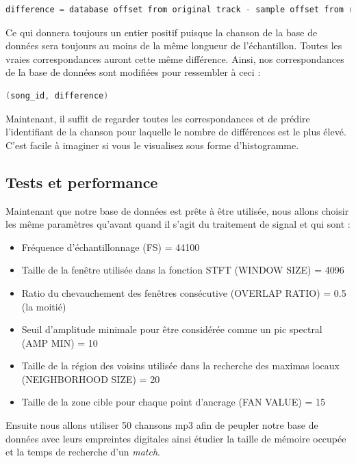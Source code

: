 \documentclass[11pt, report, french]{scrreprt}
\begin{document}
\begin{lstlisting}[language=C]
difference = database offset from original track - sample offset from recording
\end{lstlisting}

\vspace{0.5cm}
Ce qui donnera toujours un entier positif puisque la chanson de la base de données sera toujours au moins de la même longueur de l'échantillon. Toutes les vraies correspondances auront cette même différence. Ainsi, nos correspondances de la base de données sont modifiées pour ressembler à ceci : \\

\begin{lstlisting}[language=C]
(song_id, difference)
\end{lstlisting}

\vspace{0.5cm}
Maintenant, il suffit de regarder toutes les correspondances et de prédire l'identifiant de la chanson pour laquelle le nombre de différences est le plus élevé. C'est facile à imaginer si vous le visualisez sous forme d'histogramme.\\

\subsection{Tests et performance}
Maintenant que notre base de données est prête à être utilisée, nous allons choisir les même paramètres qu'avant quand il s'agit du traitement de signal et qui sont : \\

 \begin{itemize}
 	\item Fréquence d'échantillonnage (FS) = 44100
 	\item Taille de la fenêtre utilisée dans la fonction STFT (WINDOW SIZE) = 4096
 	\item Ratio du chevauchement des fenêtres consécutive (OVERLAP RATIO) = 0.5 (la moitié)
 	\item Seuil d'amplitude minimale pour être considérée comme un pic spectral (AMP MIN) = 10
 	\item Taille de la région des voisins utilisée dans la recherche des maximas locaux (NEIGHBORHOOD SIZE) = 20
 	\item Taille de la zone cible pour chaque point d'ancrage (FAN VALUE) = 15
 \end{itemize}

\vspace{0.5cm}
Ensuite nous allons utiliser 50 chansons mp3 afin de peupler notre base de données avec leurs empreintes digitales ainsi étudier la taille de mémoire occupée et la temps de recherche d'un \textit{match}.\\
\end{document}
